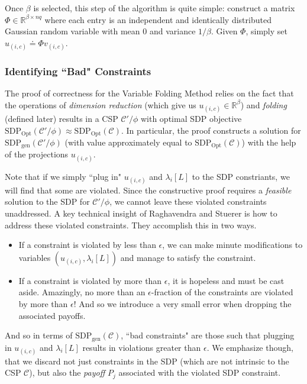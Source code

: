 Once $\beta$ is selected, this step of the algorithm is quite simple: construct a matrix $\Phi \in \mathbb{R}^{\beta \times nq}$ where each entry is an independent and identically distributed Gaussian random variable with mean 0 and variance $1/\beta$. Given $\Phi$, simply set $u_{(i,c)} \doteq \Phi v_{(i,c)}$.

\subsubsection{Identifying ``Bad" Constraints}
The proof of correctness for the Variable Folding Method relies on the fact that the operations of \textit{dimension reduction} (which give us $u_{(i,c)} \in \mathbb{R}^{\beta}$) and \textit{folding} (defined later) results in a CSP $\mathcal{C}'/\phi$ with optimal SDP objective $\text{SDP}_{\text{Opt}}(\mathcal{C}'/\phi) \approx \text{SDP}_{\text{Opt}}(\mathcal{C})$. In particular, the proof constructs a solution for $\text{SDP}_{\text{gen}}(\mathcal{C}'/\phi)$ (with value approximately equal to $ \text{SDP}_{\text{Opt}}(\mathcal{C})$) with the help of the projections $u_{(i,c)}$. 

Note that if we simply ``plug in" $u_{(i,c)}$ and $\lambda_i[L]$ to the SDP constriants, we will find that some are violated. Since the constructive proof requires a \textit{feasible} solution to the SDP for $\mathcal{C}'/\phi$, we cannot leave these violated constraints unaddressed. A key technical insight of Raghavendra and Stuerer is how to address these violated constraints. They accomplish this in two ways.

\begin{itemize}
\item If a constraint is violated by less than $\epsilon$, we can make minute modifications to variables $(u_{(i,c)},\lambda_i[L])$ and manage to satisfy the constraint.
\item If a constraint is violated by more than $\epsilon$, it is hopeless and must be cast aside. Amazingly, no more than an $\epsilon$-fraction of the constraints are violated by more than $\epsilon$! And so we introduce a very small error when dropping the associated payoffs.
\end{itemize}

And so in terms of $\text{SDP}_{\text{gen}}(\mathcal{C})$, ``bad constraints" are those such that plugging in $u_{(i,c)}$ and $\lambda_i[L]$ results in violations greater than $\epsilon$. We emphasize though, that we discard not just constraints in the SDP (which are not intrinsic to the CSP $\mathcal{C}$), but also the \textit{payoff} $P_j$ associated with the violated SDP constraint. 


